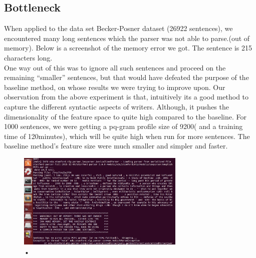 \documentclass[letterpaper]{article}
\begin{document}
\subsection{Bottleneck}
When applied to the data set Becker-Posner dataset (26922 sentences), we encountered many long sentences which the parser was not able to parse.(out of memory). Below is a screenshot of the memory error we got. The sentence is 215 characters long.\\
One way out of this was to ignore all such sentences and proceed on the remaining “smaller” sentences, but that would have defeated the purpose of the baseline method, on whose results we were trying to improve upon.
Our observation from the above experiment is that, intuitively its a good method to capture the different syntactic aspects of writers. Although, it pushes the dimensionality of the feature space to quite high compared to the baseline. For 1000 sentences, we were getting a pq-gram profile size of 9200( and a training time of 120minutes), which will be quite high when run for more sentences. The baseline method’s feature size were much smaller and simpler and faster.
\begin{figure}[H]
\caption{•}
\includegraphics[width=8cm]{Error.jpg}

\end{figure}
\end{document}
